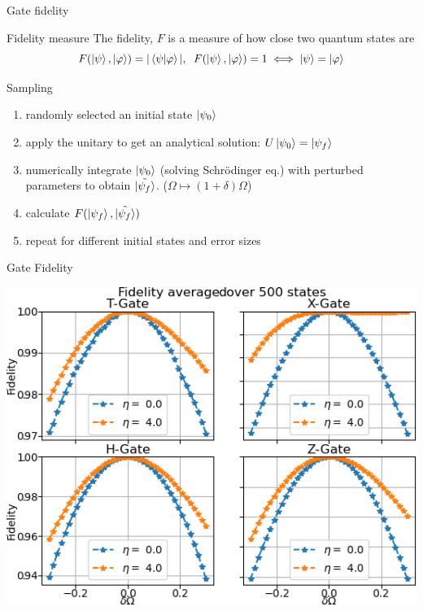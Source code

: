 \documentclass[t]{beamer}
\begin{document}
\begin{frame}{Gate fidelity}

\begin{block}{Fidelity measure}
The fidelity, $F$ is a measure of how close two quantum states are 
\begin{equation}
F(\ket{\psi},\ket{\varphi}) = |\bra{\psi}\ket{\varphi}|,\;\; F(\ket{\psi},\ket{\varphi}) = 1 \iff \ket{\psi} = \ket{\varphi}
\end{equation}

\end{block}

\begin{block}{Sampling}

\begin{enumerate}
\item randomly selected an initial state $\ket{\psi_0}$
\item apply the unitary to get an analytical solution: $U\ket{\psi_0} = \ket{\psi_{f}}$
\item numerically integrate $\ket{\psi_{0}}$ (solving Schrödinger eq.) with perturbed parameters to obtain $\tilde{\ket{\psi_{f}}}$. ($\Omega \mapsto (1+\delta)\Omega$)
\item calculate $F(\ket{\psi_{f}},\tilde{\ket{\psi_{f}}})$
\item repeat for different initial states and error sizes 
\end{enumerate}

\end{block}

\end{frame}

\begin{frame}{Gate Fidelity}
    \begin{center}
        \includegraphics[scale = 0.7]{presentation/Fid500.png}
    \end{center}
\end{frame}
\end{document}
